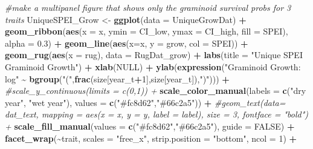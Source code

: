 \documentclass[
]{article}
\newenvironment{Shaded}{\begin{snugshade}}{\end{snugshade}}
\newcommand{\CommentTok}[1]{\textcolor[rgb]{0.56,0.35,0.01}{\textit{#1}}}
\newcommand{\DataTypeTok}[1]{\textcolor[rgb]{0.13,0.29,0.53}{#1}}
\newcommand{\DecValTok}[1]{\textcolor[rgb]{0.00,0.00,0.81}{#1}}
\newcommand{\FloatTok}[1]{\textcolor[rgb]{0.00,0.00,0.81}{#1}}
\newcommand{\KeywordTok}[1]{\textcolor[rgb]{0.13,0.29,0.53}{\textbf{#1}}}
\newcommand{\NormalTok}[1]{#1}
\newcommand{\OperatorTok}[1]{\textcolor[rgb]{0.81,0.36,0.00}{\textbf{#1}}}
\newcommand{\OtherTok}[1]{\textcolor[rgb]{0.56,0.35,0.01}{#1}}
\newcommand{\StringTok}[1]{\textcolor[rgb]{0.31,0.60,0.02}{#1}}
\begin{document}
\begin{Shaded}
\begin{Highlighting}[]
\CommentTok{\#make a multipanel figure that shows only the graminoid survival probs for 3 traits}
\NormalTok{UniqueSPEI\_Grow \textless{}{-}}\StringTok{ }\KeywordTok{ggplot}\NormalTok{(}\DataTypeTok{data =}\NormalTok{ UniqueGrowDat) }\OperatorTok{+}
\StringTok{  }\KeywordTok{geom\_ribbon}\NormalTok{(}\KeywordTok{aes}\NormalTok{(}\DataTypeTok{x =}\NormalTok{ x, }\DataTypeTok{ymin =}\NormalTok{ CI\_low, }\DataTypeTok{ymax =}\NormalTok{ CI\_high, }\DataTypeTok{fill =}\NormalTok{ SPEI), }\DataTypeTok{alpha =} \FloatTok{0.3}\NormalTok{) }\OperatorTok{+}
\StringTok{  }\KeywordTok{geom\_line}\NormalTok{(}\KeywordTok{aes}\NormalTok{(}\DataTypeTok{x=}\NormalTok{x, }\DataTypeTok{y =}\NormalTok{ grow, }\DataTypeTok{col =}\NormalTok{ SPEI))  }\OperatorTok{+}\StringTok{ }
\StringTok{  }\KeywordTok{geom\_rug}\NormalTok{(}\KeywordTok{aes}\NormalTok{(}\DataTypeTok{x =}\NormalTok{ rug), }\DataTypeTok{data =}\NormalTok{ RugDat\_grow) }\OperatorTok{+}
\StringTok{  }\KeywordTok{labs}\NormalTok{(}\DataTypeTok{title =} \StringTok{"Unique SPEI Graminoid Growth"}\NormalTok{) }\OperatorTok{+}
\StringTok{  }\KeywordTok{xlab}\NormalTok{(}\OtherTok{NULL}\NormalTok{) }\OperatorTok{+}
\StringTok{  }\KeywordTok{ylab}\NormalTok{(}\KeywordTok{expression}\NormalTok{(}\StringTok{"Graminoid Growth: log"} \OperatorTok{\textasciitilde{}}\StringTok{ }\KeywordTok{bgroup}\NormalTok{(}\StringTok{"("}\NormalTok{,}\KeywordTok{frac}\NormalTok{(size[year\_t}\OperatorTok{+}\DecValTok{1}\NormalTok{],size[year\_t]),}\StringTok{")"}\NormalTok{))) }\OperatorTok{+}
\StringTok{  }\CommentTok{\#scale\_y\_continuous(limits = c(0,1)) +}
\StringTok{  }\KeywordTok{scale\_color\_manual}\NormalTok{(}\DataTypeTok{labels =} \KeywordTok{c}\NormalTok{(}\StringTok{"dry year"}\NormalTok{, }\StringTok{"wet year"}\NormalTok{), }\DataTypeTok{values =} \KeywordTok{c}\NormalTok{(}\StringTok{"\#fc8d62"}\NormalTok{,}\StringTok{"\#66c2a5"}\NormalTok{)) }\OperatorTok{+}
\StringTok{  }\CommentTok{\#geom\_text(data= dat\_text, mapping = aes(x = x, y = y, label = label), size = 3, fontface = "bold") +}
\StringTok{  }\KeywordTok{scale\_fill\_manual}\NormalTok{(}\DataTypeTok{values =} \KeywordTok{c}\NormalTok{(}\StringTok{"\#fc8d62"}\NormalTok{,}\StringTok{"\#66c2a5"}\NormalTok{), }\DataTypeTok{guide =} \OtherTok{FALSE}\NormalTok{) }\OperatorTok{+}
\StringTok{  }\KeywordTok{facet\_wrap}\NormalTok{(}\OperatorTok{\textasciitilde{}}\NormalTok{trait, }\DataTypeTok{scales =} \StringTok{"free\_x"}\NormalTok{, }\DataTypeTok{strip.position =}  \StringTok{"bottom"}\NormalTok{, }\DataTypeTok{ncol =} \DecValTok{1}\NormalTok{) }\OperatorTok{+}

\end{Highlighting}
\end{Shaded}
\end{document}
